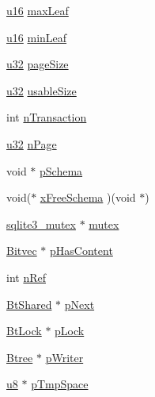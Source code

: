 \begin{DoxyCompactItemize}
\item 
\hyperlink{sqlite3_8c_a20f2299e322dcbde37cb07b16910b843}{u16} \hyperlink{struct_bt_shared_a474248f018d24457ec306a7b570d24ce}{max\-Leaf}
\item 
\hyperlink{sqlite3_8c_a20f2299e322dcbde37cb07b16910b843}{u16} \hyperlink{struct_bt_shared_ad57c14f1681d0e86f1c9a9488013eba0}{min\-Leaf}
\item 
\hyperlink{sqlite3_8c_a03ad5adfaeb9b7640dde78a0cc390319}{u32} \hyperlink{struct_bt_shared_a9e42a71e5e3f98ec1e5b30998b27aae0}{page\-Size}
\item 
\hyperlink{sqlite3_8c_a03ad5adfaeb9b7640dde78a0cc390319}{u32} \hyperlink{struct_bt_shared_a3209efe543084a7e60f22913a794f5cb}{usable\-Size}
\item 
int \hyperlink{struct_bt_shared_a6101a0e79a95e884ac4dc9c70a947715}{n\-Transaction}
\item 
\hyperlink{sqlite3_8c_a03ad5adfaeb9b7640dde78a0cc390319}{u32} \hyperlink{struct_bt_shared_a8679241243f9043ede97b5c57d20c3ea}{n\-Page}
\item 
void $\ast$ \hyperlink{struct_bt_shared_aea3ccb6775c768fbd4f3e29df8cb925d}{p\-Schema}
\item 
void($\ast$ \hyperlink{struct_bt_shared_a7c4816c63acea30ed44ffc58b468463e}{x\-Free\-Schema} )(void $\ast$)
\item 
\hyperlink{structsqlite3__mutex}{sqlite3\-\_\-mutex} $\ast$ \hyperlink{struct_bt_shared_a454c31d726220bbed43c165e370460c8}{mutex}
\item 
\hyperlink{struct_bitvec}{Bitvec} $\ast$ \hyperlink{struct_bt_shared_ace6191dc3f48f9575d7946ab8cf5b919}{p\-Has\-Content}
\item 
int \hyperlink{struct_bt_shared_a43d0226fa08d7fae5f992f3a2d72cc08}{n\-Ref}
\item 
\hyperlink{struct_bt_shared}{Bt\-Shared} $\ast$ \hyperlink{struct_bt_shared_aaa9dd5c5d4ec2bb79ebe4b37ee926ae3}{p\-Next}
\item 
\hyperlink{struct_bt_lock}{Bt\-Lock} $\ast$ \hyperlink{struct_bt_shared_af58c79eec88f99ed5a07d8cabf8a1d1a}{p\-Lock}
\item 
\hyperlink{struct_btree}{Btree} $\ast$ \hyperlink{struct_bt_shared_ad8b2679e54027d58a3be3afcca4df1d6}{p\-Writer}
\item 
\hyperlink{sqlite3_8c_a74a0f6424ae628af25f23f0a35f6ead3}{u8} $\ast$ \hyperlink{struct_bt_shared_a89102c20327da8a304f7e95af557bdf4}{p\-Tmp\-Space}
\end{DoxyCompactItemize}


